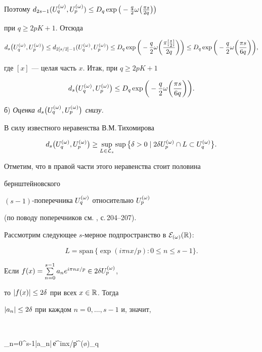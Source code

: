 Поэтому $d_{2s-1}(\uqo,\upo)\le D_q


\exp{\big(-\frac q2\o\big(\frac{\pi s}{2q}\big)\big)}$


при $q\ge 2pK+1$. Отсюда 


$$


\dqp\le d_{2[s/2]-1}(\uqo,\upo)\le


D_q\exp{\bigg(-\frac q2\o\bigg(\frac{\pi[\frac s2]}{2q}\bigg)\bigg)}\le


D_q\exp{\bigg(-\frac q2\o\bigg(\frac{\pi s}{6q}\bigg)\bigg)},


$$ 


где $[x]$ --- целая часть $x$. Итак, при $q\ge 2pK+1$


\begin{equation}\label{e:7}


\dqp\le D_q\exp{\bigg(-\frac q2\o\bigg(\frac{\pi s}{6q}\bigg)\bigg)}.


\end{equation}





б) {\it Оценка $d_s\big(U^{(\omega)}_q, U^{(\omega)}_p\big)$ снизу.}


В силу известного неравенства В.М.\,Тихомирова


$$


\dqp\ge\sup_{L\in{\cal L}_s}\sup\big\{\d>0\mid


2\d\upo\cap L\subset \uqo\big\}.


$$


Отметим, что в правой части этого неравенства стоит половина 


бернштейновского


$(s-1)$-по\-пе\-реч\-ни\-ка $U^{(\omega)}_q$ относительно $U^{(\omega)}_p$ 


(по поводу поперечников см. \cite{Tikh}, с.\,204--207).


Рассмотрим следующее $s$-мерное подпространство в ${\cal E}_{(\omega)}(\Bbb R)$:


$$


L=\mathrm{span}\,\{ \exp{(i\pi nx/p)}: 0\le n\le s-1\}.


$$


Если $f(x)=\sum\limits_{n=0}^{s-1}a_ne^{i\pi nx/p}\in2\delta U^{(\omega)}_p$,


то $|f(x)|\le 2\delta$ при  всех $x\in\Bbb R$. Тогда 


$|a_n|\le 2\delta$ при каждом $n=0,\dotsc,s-1$ и, значит,


$$


\fqo\le\sum_{n=0}^{s-1}|a_n|\,\|e^{i\pi nx/p}\|^{(\o)}_q\le


